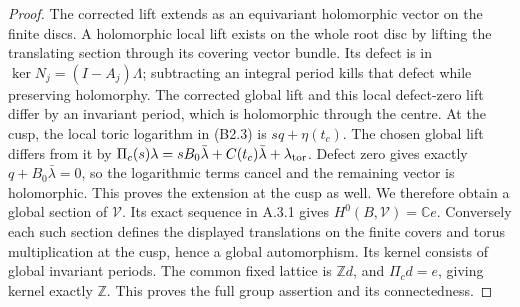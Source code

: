 \begin{proof}
The corrected lift extends as an equivariant holomorphic vector on the finite discs. A holomorphic local lift exists on the whole root disc by lifting the translating section through its covering vector bundle. Its defect is in $\ker N_j=(I-A_j)\Lambda$; subtracting an integral period kills that defect while preserving holomorphy. The corrected global lift and this local defect-zero lift differ by an invariant period, which is holomorphic through the centre. At the cusp, the local toric logarithm in (B2.3) is $sq+\eta(t_c)$. The chosen global lift differs from it by $\Pi_c(s)\lambda=sB_0\bar\lambda+C(t_c)\bar\lambda+\lambda_{\rm tor}$. Defect zero gives exactly $q+B_0\bar\lambda=0$, so the logarithmic terms cancel and the remaining vector is holomorphic. This proves the extension at the cusp as well. We therefore obtain a global section of $\mathcal V$. Its exact sequence in A.3.1 gives $H^0(B,\mathcal V)=\mathbb Ce$. Conversely each such section defines the displayed translations on the finite covers and torus multiplication at the cusp, hence a global automorphism. Its kernel consists of global invariant periods. The common fixed lattice is $\mathbb Zd$, and $\Pi_cd=e$, giving kernel exactly $\mathbb Z$. This proves the full group assertion and its connectedness.
\end{proof}


